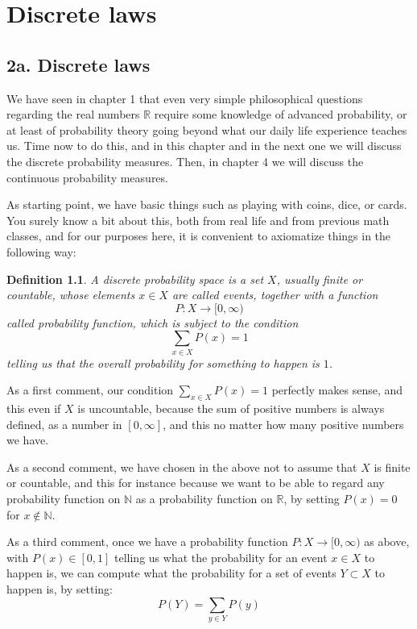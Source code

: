 \documentclass[12pt]{amsbook}
\newtheorem{definition}[theorem]{Definition}
\begin{document}
\chapter{Discrete laws}

\section*{2a. Discrete laws}

We have seen in chapter 1 that even very simple philosophical questions regarding the real numbers $\mathbb R$ require some knowledge of advanced probability, or at least of probability theory going beyond what our daily life experience teaches us. Time now to do this, and in this chapter and in the next one we will discuss the discrete probability measures. Then, in chapter 4 we will discuss the continuous probability measures.

\bigskip

As starting point, we have basic things such as playing with coins, dice, or cards. You surely know a bit about this, both from real life and from previous math classes, and for our purposes here, it is convenient to axiomatize things in the following way:

\begin{definition}
A discrete probability space is a set $X$, usually finite or countable, whose elements $x\in X$ are called events, together with a function
$$P:X\to[0,\infty)$$
called probability function, which is subject to the condition
$$\sum_{x\in X}P(x)=1$$
telling us that the overall probability for something to happen is $1$.
\end{definition}

As a first comment, our condition $\sum_{x\in X}P(x)=1$ perfectly makes sense, and this even if $X$ is uncountable, because the sum of positive numbers is always defined, as a number in $[0,\infty]$, and this no matter how many positive numbers we have.

\bigskip

As a second comment, we have chosen in the above not to assume that $X$ is finite or countable, and this for instance because we want to be able to regard any probability function on $\mathbb N$ as a probability function on $\mathbb R$, by setting $P(x)=0$ for $x\notin\mathbb N$. 

\bigskip

As a third comment, once we have a probability function $P:X\to[0,\infty)$ as above, with $P(x)\in[0,1]$ telling us what the probability for an event $x\in X$ to happen is, we can compute what the probability for a set of events $Y\subset X$ to happen is, by setting:
$$P(Y)=\sum_{y\in Y}P(y)$$
\end{document}
